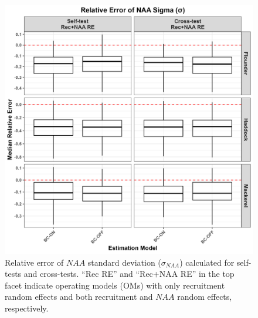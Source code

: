 \documentclass[
  12pt,
]{article}
\begin{document}
\begin{figure}[H]
\centering
\includegraphics[width=\textwidth]{Revised_Figures&Tables/NAA_sigma.PNG}
\caption{Relative error of $NAA$ standard deviation ($\sigma_{NAA}$) calculated for self-tests and cross-tests. ``Rec RE'' and ``Rec+NAA RE'' in the top facet indicate operating models (OMs) with only recruitment random effects and both recruitment and $NAA$ random effects, respectively.}
\label{fig:NAA_sigma}
\end{figure}
\end{document}
